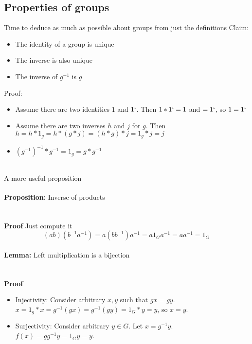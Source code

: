 \documentclass{article}
\begin{document}
\subsection{Properties of groups}
Time to deduce as much as possible about groups from just the definitions
Claim:
\begin{itemize}
    \item The identity of a group is unique
    \item The inverse is also unique
    \item The inverse of $g^{-1}$ is $g$
\end{itemize}
Proof:
\begin{itemize}
    \item Assume there are two identities $1$ and $1`$. Then $1*1` = 1$ and $= 1`$, so $1=1`$
    \item Assume there are two inverses $h$ and $j$ for $g$. Then $h = h*1_g = h * (g * j) = (h * g) * j  = 1_g*j = j$
    \item $(g^{-1})^{-1}*g^{-1} = 1_g = g * g^{-1}$
\end{itemize}
~\\
A more useful proposition \\
~\\
\textbf{Proposition:} Inverse of products~\\
~\newline
\indent {}
~\\
~\\
\textbf{Proof} Just compute it
$$(ab)(b^{-1}a^{-1}) = a(bb^{-1})a^{-1} = a1_Ga^{-1} = aa^{-1} = 1_G$$
~\\
\textbf{Lemma:} Left multiplication is a bijection ~\\
~\\
\indent {}
~\\
\textbf{Proof}
\begin{itemize}
    \item Injectivity: Consider arbitrary $x,y$ such that $gx = gy$. $x = 1_g * x = g^{-1}(gx) = g^{-1}(gy) = 1_G*y = y $, so $x = y$.
    \item Surjectivity: Consider arbitrary $y\in G$. Let $x = g^{-1}y$. $f(x) = gg^{-1}y = 1_Gy = y$.
\end{itemize}
\end{document}
